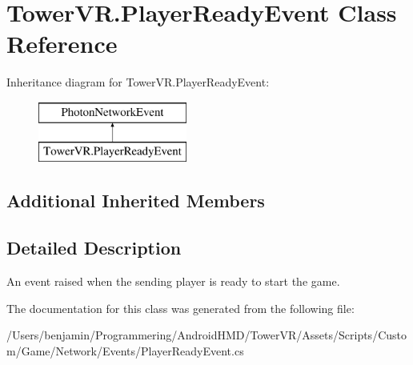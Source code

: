 \hypertarget{class_tower_v_r_1_1_player_ready_event}{}\section{Tower\+V\+R.\+Player\+Ready\+Event Class Reference}
\label{class_tower_v_r_1_1_player_ready_event}
Inheritance diagram for Tower\+V\+R.\+Player\+Ready\+Event\+:\begin{figure}[H]
\begin{center}
\leavevmode
\includegraphics[height=2.000000cm]{class_tower_v_r_1_1_player_ready_event}
\end{center}
\end{figure}
\subsection*{Additional Inherited Members}


\subsection{Detailed Description}
An event raised when the sending player is ready to start the game. 

The documentation for this class was generated from the following file\+:\begin{DoxyCompactItemize}
\item 
/\+Users/benjamin/\+Programmering/\+Android\+H\+M\+D/\+Tower\+V\+R/\+Assets/\+Scripts/\+Custom/\+Game/\+Network/\+Events/Player\+Ready\+Event.\+cs\end{DoxyCompactItemize}

